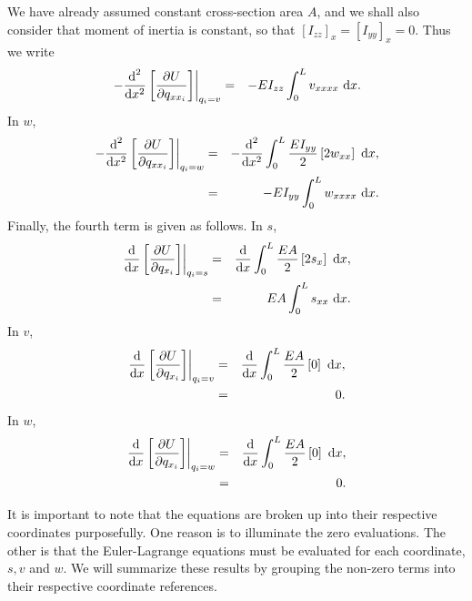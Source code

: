 We have already assumed constant cross-section area $A$, and we shall also consider that moment of inertia is constant, so that $[I_{zz}]_x=[I_{yy}]_x=0$. Thus we write
\begin{eqnarray}
\left.-\frac{\text d^2}{\text dx^2}\left[\frac{\partial U}{\partial q_{xx_i}}\right]\right|_{q_i=v} 
&=& -EI_{zz}\int_0^L v_{xxxx}\text{ d}x. 
\end{eqnarray}
In $w$,
\begin{eqnarray}
\left.-\frac{\text d^2}{\text dx^2}\left[\frac{\partial U}{\partial q_{xx_i}}\right]\right|_{q_i=w} 
&=& -\frac{\text d^2}{\text dx^2}\int_0^L\frac{EI_{yy}}{2}\left[ 2w_{xx} \right]\text{ d}x,\\
&=& -EI_{yy}\int_0^L w_{xxxx}\text{ d}x. 
\end{eqnarray}
Finally, the fourth term is given as follows. In $s$,
\begin{eqnarray}
\left.\frac{\text d}{\text dx}\left[\frac{\partial U}{\partial q_{x_i}}\right]\right|_{q_i=s} 
&=& \frac{\text d}{\text dx}\int_0^L\frac{EA}{2}\left[ 2s_{x} \right]\text{ d}x,\\
&=& EA\int_0^L s_{xx}\text{ d}x.
\end{eqnarray}
In $v$,
\begin{eqnarray}
\left.\frac{\text d}{\text dx}\left[\frac{\partial U}{\partial q_{x_i}}\right]\right|_{q_i=v} 
&=& \frac{\text d}{\text dx}\int_0^L\frac{EA}{2}\left[ 0\right]\text{ d}x,\\
&=& 0.
\end{eqnarray}
In $w$,
\begin{eqnarray}
\left.\frac{\text d}{\text dx}\left[\frac{\partial U}{\partial q_{x_i}}\right]\right|_{q_i=w} 
&=& \frac{\text d}{\text dx}\int_0^L\frac{EA}{2}\left[ 0\right]\text{ d}x,\\
&=& 0.
\end{eqnarray}

It is important to note that the equations are broken up into their respective coordinates purposefully. One reason is to illuminate the zero evaluations. The other is that the Euler-Lagrange equations must be evaluated for each coordinate, $s,v$ and $w$. We will summarize these results by grouping the non-zero terms into their respective coordinate references.

